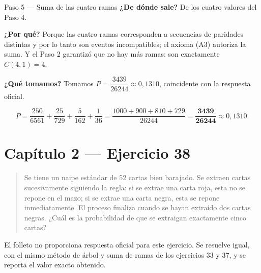 \documentclass[11pt]{article}
\begin{document}
\begin{sol}
\begin{paso}{Paso 5 --- Suma de las cuatro ramas}
\textbf{¿De d\'onde sale?} De los cuatro valores del Paso 4.

\textbf{¿Por qu\'e?} Porque las cuatro ramas corresponden a secuencias de paridades distintas y por lo tanto son eventos incompatibles; el axioma (A3) autoriza la suma. Y el Paso 2 garantiz\'o que no hay m\'as ramas: son exactamente $C(4,1)=4$.

\textbf{¿Qu\'e tomamos?} Tomamos $P=\dfrac{3439}{26244}\approx 0{,}1310$, coincidente con la respuesta oficial.
\end{paso}

\end{sol}

\begin{resp}
\[
P=\frac{250}{6561}+\frac{25}{729}+\frac{5}{162}+\frac{1}{36}
=\frac{1000+900+810+729}{26244}
=\mathbf{\frac{3439}{26244}}\approx 0{,}1310 .
\]
\end{resp}

\section*{Cap\'itulo 2 --- Ejercicio 38}

\begin{quote}
Se tiene un naipe est\'andar de 52 cartas bien barajado. Se extraen cartas sucesivamente siguiendo la regla: si se extrae una carta roja, esta no se repone en el mazo; si se extrae una carta negra, esta se repone inmediatamente. El proceso finaliza cuando se hayan extra\'ido dos cartas negras. ¿Cu\'al es la probabilidad de que se extraigan exactamente cinco cartas?
\end{quote}

\begin{nota}
El folleto no proporciona respuesta oficial para este ejercicio. Se resuelve igual, con el mismo m\'etodo de \'arbol y suma de ramas de los ejercicios 33 y 37, y se reporta el valor exacto obtenido.
\end{nota}
\end{document}
